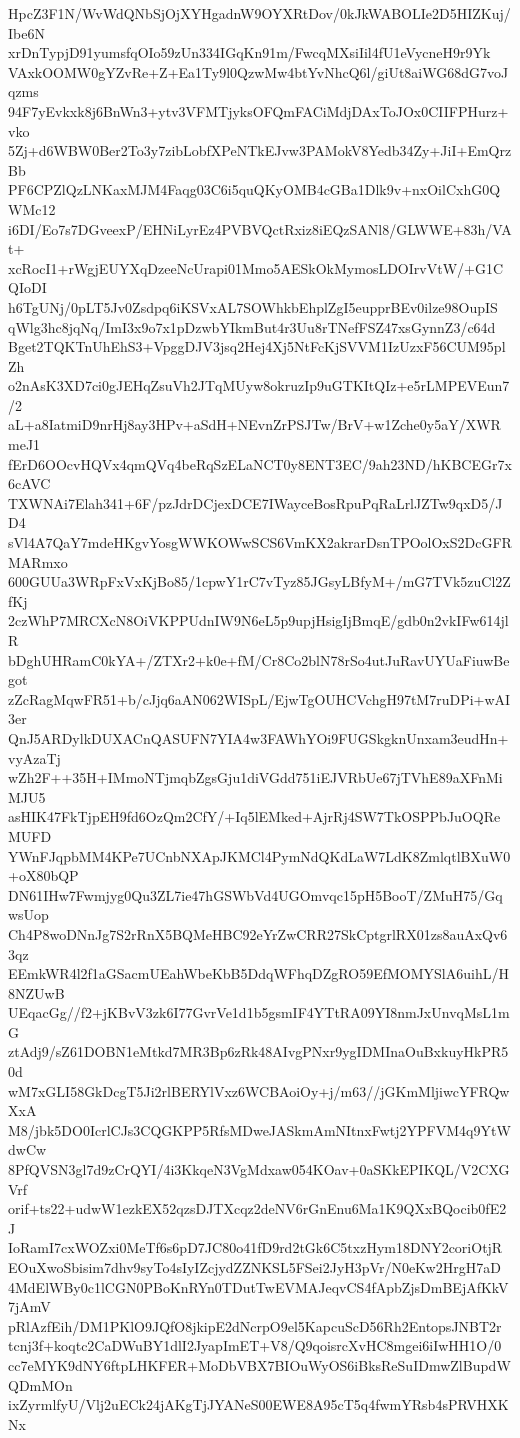 HpcZ3F1N/WvWdQNbSjOjXYHgadnW9OYXRtDov/0kJkWABOLIe2D5HIZKuj/Ibe6N
xrDnTypjD91yumsfqOIo59zUn334IGqKn91m/FwcqMXsiIil4fU1eVycneH9r9Yk
VAxkOOMW0gYZvRe+Z+Ea1Ty9l0QzwMw4btYvNhcQ6l/giUt8aiWG68dG7voJqzms
94F7yEvkxk8j6BnWn3+ytv3VFMTjyksOFQmFACiMdjDAxToJOx0CIIFPHurz+vko
5Zj+d6WBW0Ber2To3y7zibLobfXPeNTkEJvw3PAMokV8Yedb34Zy+JiI+EmQrzBb
PF6CPZlQzLNKaxMJM4Faqg03C6i5quQKyOMB4cGBa1Dlk9v+nxOilCxhG0QWMc12
i6DI/Eo7s7DGveexP/EHNiLyrEz4PVBVQctRxiz8iEQzSANl8/GLWWE+83h/VAt+
xcRocI1+rWgjEUYXqDzeeNcUrapi01Mmo5AESkOkMymosLDOIrvVtW/+G1CQIoDI
h6TgUNj/0pLT5Jv0Zsdpq6iKSVxAL7SOWhkbEhplZgI5eupprBEv0ilze98OupIS
qWlg3hc8jqNq/ImI3x9o7x1pDzwbYIkmBut4r3Uu8rTNefFSZ47xsGynnZ3/c64d
Bget2TQKTnUhEhS3+VpggDJV3jsq2Hej4Xj5NtFcKjSVVM1IzUzxF56CUM95plZh
o2nAsK3XD7ci0gJEHqZsuVh2JTqMUyw8okruzIp9uGTKItQIz+e5rLMPEVEun7/2
aL+a8IatmiD9nrHj8ay3HPv+aSdH+NEvnZrPSJTw/BrV+w1Zche0y5aY/XWRmeJ1
fErD6OOcvHQVx4qmQVq4beRqSzELaNCT0y8ENT3EC/9ah23ND/hKBCEGr7x6cAVC
TXWNAi7Elah341+6F/pzJdrDCjexDCE7IWayceBosRpuPqRaLrlJZTw9qxD5/JD4
sVl4A7QaY7mdeHKgvYosgWWKOWwSCS6VmKX2akrarDsnTPOolOxS2DcGFRMARmxo
600GUUa3WRpFxVxKjBo85/1cpwY1rC7vTyz85JGsyLBfyM+/mG7TVk5zuCl2ZfKj
2czWhP7MRCXcN8OiVKPPUdnIW9N6eL5p9upjHsigIjBmqE/gdb0n2vkIFw614jlR
bDghUHRamC0kYA+/ZTXr2+k0e+fM/Cr8Co2blN78rSo4utJuRavUYUaFiuwBegot
zZcRagMqwFR51+b/cJjq6aAN062WISpL/EjwTgOUHCVchgH97tM7ruDPi+wAI3er
QnJ5ARDylkDUXACnQASUFN7YIA4w3FAWhYOi9FUGSkgknUnxam3eudHn+vyAzaTj
wZh2F++35H+IMmoNTjmqbZgsGju1diVGdd751iEJVRbUe67jTVhE89aXFnMiMJU5
asHIK47FkTjpEH9fd6OzQm2CfY/+Iq5lEMked+AjrRj4SW7TkOSPPbJuOQReMUFD
YWnFJqpbMM4KPe7UCnbNXApJKMCl4PymNdQKdLaW7LdK8ZmlqtlBXuW0+oX80bQP
DN61IHw7Fwmjyg0Qu3ZL7ie47hGSWbVd4UGOmvqc15pH5BooT/ZMuH75/GqwsUop
Ch4P8woDNnJg7S2rRnX5BQMeHBC92eYrZwCRR27SkCptgrlRX01zs8auAxQv63qz
EEmkWR4l2f1aGSacmUEahWbeKbB5DdqWFhqDZgRO59EfMOMYSlA6uihL/H8NZUwB
UEqacGg//f2+jKBvV3zk6I77GvrVe1d1b5gsmIF4YTtRA09YI8nmJxUnvqMsL1mG
ztAdj9/sZ61DOBN1eMtkd7MR3Bp6zRk48AIvgPNxr9ygIDMInaOuBxkuyHkPR50d
wM7xGLI58GkDcgT5Ji2rlBERYlVxz6WCBAoiOy+j/m63//jGKmMljiwcYFRQwXxA
M8/jbk5DO0IcrlCJs3CQGKPP5RfsMDweJASkmAmNItnxFwtj2YPFVM4q9YtWdwCw
8PfQVSN3gl7d9zCrQYI/4i3KkqeN3VgMdxaw054KOav+0aSKkEPIKQL/V2CXGVrf
orif+ts22+udwW1ezkEX52qzsDJTXcqz2deNV6rGnEnu6Ma1K9QXxBQocib0fE2J
IoRamI7cxWOZxi0MeTf6s6pD7JC80o41fD9rd2tGk6C5txzHym18DNY2coriOtjR
EOuXwoSbisim7dhv9syTo4sIyIZcjydZZNKSL5FSei2JyH3pVr/N0eKw2HrgH7aD
4MdElWBy0c1lCGN0PBoKnRYn0TDutTwEVMAJeqvCS4fApbZjsDmBEjAfKkV7jAmV
pRlAzfEih/DM1PKlO9JQfO8jkipE2dNcrpO9el5KapcuScD56Rh2EntopsJNBT2r
tcnj3f+koqtc2CaDWuBY1dlI2JyapImET+V8/Q9qoisrcXvHC8mgei6iIwHH1O/0
cc7eMYK9dNY6ftpLHKFER+MoDbVBX7BIOuWyOS6iBksReSuIDmwZlBupdWQDmMOn
ixZyrmlfyU/Vlj2uECk24jAKgTjJYANeS00EWE8A95cT5q4fwmYRsb4sPRVHXKNx

